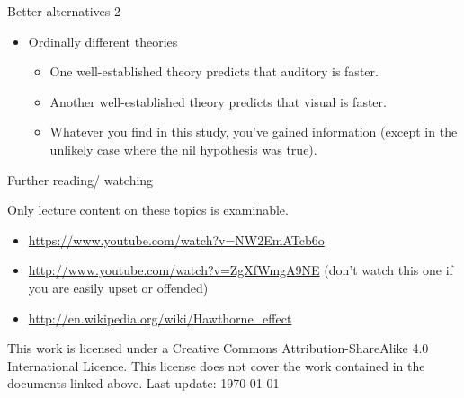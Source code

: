 \documentclass{beamer}
\begin{document}
\begin{frame}{Better alternatives 2}
\begin{itemize}
\item Ordinally different theories
\begin{itemize}
\item One well-established theory predicts that auditory is faster.
\item Another well-established theory predicts that visual is faster.
\item Whatever you find in this study, you've gained information (except in the unlikely case where the nil hypothesis was true).
\end{itemize}
\end{itemize}
\end{frame}


\begin{frame}{Further reading/ watching}

Only lecture content on these topics is examinable.

\begin{itemize}
\item \url{https://www.youtube.com/watch?v=NW2EmATcb6o}
\item \url{http://www.youtube.com/watch?v=ZgXfWmgA9NE} (don't watch this one if you are easily upset or offended)	
\item  \url{http://en.wikipedia.org/wiki/Hawthorne_effect}
\end{itemize}

\tiny This work is licensed under a Creative Commons
Attribution-ShareAlike 4.0 International Licence. This license does
not cover the work contained in the documents linked above. Last
update: \today

\end{frame}
\end{document}
